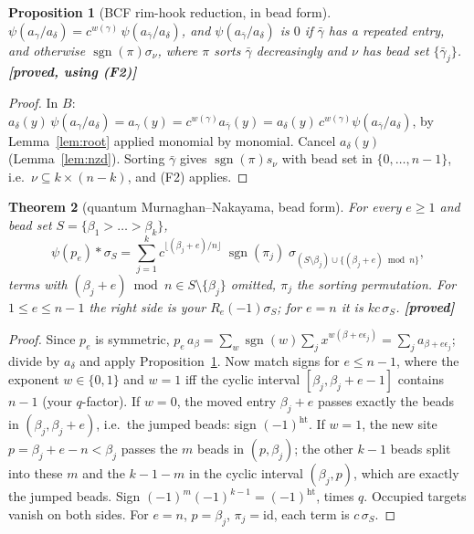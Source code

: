 \documentclass[11pt]{article}
\newtheorem{theorem}{Theorem}
\newtheorem{proposition}[theorem]{Proposition}
\theoremstyle{remark}
\newcommand{\grade}[1]{\textbf{[#1]}}
\DeclareMathOperator{\hgt}{ht}
\DeclareMathOperator{\sgn}{sgn}
\begin{document}
\begin{proposition}[BCF rim-hook reduction, in bead form]\label{prop:bcf}
$\psi(a_\gamma/a_\delta)=c^{w(\gamma)}\,\psi(a_{\bar\gamma}/a_\delta)$, and $\psi(a_{\bar\gamma}/a_\delta)$ is $0$ if $\bar\gamma$ has a repeated
entry, and otherwise $\sgn(\pi)\sigma_\nu$, where $\pi$ sorts $\bar\gamma$ decreasingly and $\nu$ has bead set $\{\bar\gamma_j\}$.
\grade{proved, using (F2)}
\end{proposition}
\begin{proof}
In $B$: $a_\delta(y)\,\psi(a_\gamma/a_\delta)=a_\gamma(y)=c^{w(\gamma)}a_{\bar\gamma}(y)=a_\delta(y)\,c^{w(\gamma)}\psi(a_{\bar\gamma}/a_\delta)$, by
Lemma~\ref{lem:root} applied monomial by monomial. Cancel $a_\delta(y)$ (Lemma~\ref{lem:nzd}). Sorting $\bar\gamma$ gives
$\sgn(\pi)s_\nu$ with bead set in $\{0,\dots,n-1\}$, i.e.\ $\nu\subseteq k\times(n-k)$, and (F2) applies.
\end{proof}

\begin{theorem}[quantum Murnaghan--Nakayama, bead form]\label{thm:qMN}
For every $e\ge1$ and bead set $S=\{\beta_1>\dots>\beta_k\}$,
\[
\psi(p_e)*\sigma_S=\sum_{j=1}^k c^{\lfloor(\beta_j+e)/n\rfloor}\;\sgn(\pi_j)\;\sigma_{(S\setminus\beta_j)\cup\{(\beta_j+e)\bmod n\}},
\]
terms with $(\beta_j+e)\bmod n\in S\setminus\{\beta_j\}$ omitted, $\pi_j$ the sorting permutation.
For $1\le e\le n-1$ the right side is your $R_e(-1)\sigma_S$; for $e=n$ it is $kc\,\sigma_S$. \grade{proved}
\end{theorem}
\begin{proof}
Since $p_e$ is symmetric, $p_e\,a_\beta=\sum_w\sgn(w)\sum_jx^{w(\beta+e\epsilon_j)}=\sum_ja_{\beta+e\epsilon_j}$;
divide by $a_\delta$ and apply Proposition~\ref{prop:bcf}. Now match signs for $e\le n-1$, where the exponent
$w\in\{0,1\}$ and $w=1$ iff the cyclic interval $[\beta_j,\beta_j+e-1]$ contains $n-1$ (your $q$-factor).
If $w=0$, the moved entry $\beta_j+e$ passes exactly the beads in $(\beta_j,\beta_j+e)$, i.e.\ the jumped beads:
sign $(-1)^{\hgt}$. If $w=1$, the new site $p=\beta_j+e-n<\beta_j$ passes the $m$ beads in $(p,\beta_j)$; the other
$k-1$ beads split into these $m$ and the $k-1-m$ in the cyclic interval $(\beta_j,p)$, which are exactly the
jumped beads. Sign $(-1)^m(-1)^{k-1}=(-1)^{\hgt}$, times $q$. Occupied targets vanish on both sides. For $e=n$,
$p=\beta_j$, $\pi_j=\mathrm{id}$, each term is $c\,\sigma_S$.
\end{proof}
\end{document}
